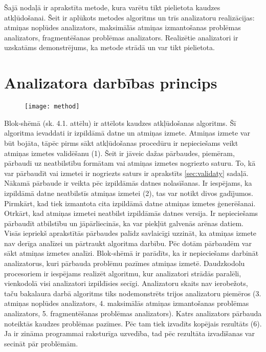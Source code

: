 ﻿Šajā nodaļā ir aprakstīta metode, kura varētu tikt pielietota kaudzes atkļūdošanai. 
Šeit ir aplūkots metodes algoritms un trīs analizatoru realizācijas: atmiņas noplūdes analizators, maksimālās atmiņas izmantošanas problēmas analizators, fragmentēšanas problēmas analizators.
Realizētie analizatori ir uzskatāms demonstrējums, ka metode strādā un var tikt pielietota.
\section{Analizatora darbības princips}

 \begin{figure}[h]
\begin{center}
\texttt{[image: method]}
\end{center}
\caption{\textbf{\fontsize{11}{12}\selectfont {Uz metodi balstītā algoritma blok-shēma}}}
\end{figure}

Blok-shēmā (sk. 4.1. attēlu) ir attēlots kaudzes atkļūdošanas algoritms.
Šī algoritma ievaddati ir izpildāmā datne un atmiņas izmete.
Atmiņas izmete var būt bojāta, tāpēc pirms sākt atkļūdošanas procedūru ir nepieciešams veikt atmiņas izmetes validēšanu (1).
Šeit ir jāveic dažas pārbaudes, piemēram, pārbaudi uz neatbilstību formātam vai atmiņas izmetes nogriezto saturu.
To, kā var pārbaudīt vai izmetei ir nogriezts saturs ir aprakstīts \ref{sec:validaty} sadaļā.
Nākamā pārbaude ir veikta pēc izpildāmās datnes nolasīšanas.
Ir iespējams, ka izpildāmā datne neatbilstīs atmiņas izmetei (2), tas var notikt divos gadījumos.
Pirmkārt, kad tiek izmantota cita izpildāmā datne atmiņas izmetes ģenerēšanai.
Otrkārt, kad atmiņas izmetei neatbilst izpildāmās datnes versija.
Ir nepieciešams pārbaudīt atbilstību un jāpārliecinās, ka var piekļūt galvenās arēnas datiem.
Visās iepriekš aprakstītās pārbaudes palīdz savlaicīgi uzzināt, ka atmiņas izmete nav derīga analīzei un pārtraukt algoritma darbību.
Pēc dotām pārbaudēm var sākt atmiņas izmetes analīzi.
Blok-shēmā ir parādīts, ka ir nepieciešams darbināt analizatorus, kuri  pārbauda problēmu pazīmes atmiņas izmetē.
Daudzkodolu procesoriem ir iespējams realizēt algoritmu, kur analizatori strādās paralēli, vienkodolā visi analizatori izpildīsies secīgi.
Analizatoru skaits nav ierobežots, taču bakalaura darbā algoritms tiks nodemonstrēts trijos analizatoru piemēros (3. atmiņas noplūdes analizators, 4. maksimālās atmiņas izmantošanas problēmas analizators, 5. fragmentēšanas problēmas analizators).
Katrs analizators pārbauda noteiktās kaudzes problēmas pazīmes.
Pēc tam tiek izvadīts kopējais rezultāts (6).
Ja ir zināma programmai raksturīga uzvedība, tad pēc rezultāta izvadīšanas var secināt pār problēmām.

